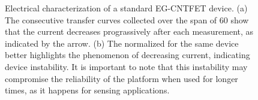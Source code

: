 \begin{figure}
    \centering
    \quad
    \caption{Electrical characterization of a standard EG-CNTFET device. 
    (a) The consecutive transfer curves collected over the span of \SI{60}{\min} show that the current decreases prograssively after each measurement, as indicated by the arrow.
    (b) The normalized \ion{} for the same device better highlights the phenomenon of decreasing current, indicating device instability. It is important to note that this instability may compromise the reliability of the platform when used for longer times, as it happens for sensing applications.}
    \label{fig:noMem}
\end{figure}

